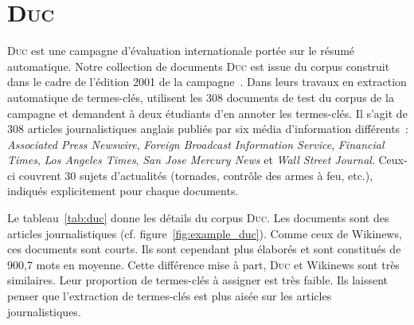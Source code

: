   \section[\textsc{Duc}]{\textsc{Duc}~\textnormal{\large\cite{wan2008expandrank}}}
  \label{sec:main-data_description-duc_data}
    \textsc{Duc} est une campagne d'évaluation internationale portée sur le
    résumé automatique. Notre collection de documents \textsc{Duc} est issue du
    corpus construit dans le cadre de l'édition 2001 de la
    campagne~\cite{over2001duc}. Dans leurs travaux en extraction automatique de
    termes-clés,  utilisent les 308 documents de test
    du corpus de la campagne et demandent à deux étudiants d'en annoter les
    termes-clés. Il s'agit de 308 articles journalistiques  anglais publiés par
    six média d'information différents~: \textit{Associated Press Newswire},
    \textit{Foreign Broadcast Information Service}, \textit{Financial Times},
    \textit{Los Angeles Times}, \textit{San Jose Mercury News} et \textit{Wall
    Street Journal}. Ceux-ci couvrent 30 sujets d'actualités (tornades, contrôle
    des armes à feu, etc.), indiqués explicitement pour chaque documents.
    
    Le tableau~\ref{tab:duc} donne les détails du corpus \textsc{Duc}. Les
    documents sont des articles journalistiques (cf.
    figure~\ref{fig:example_duc}). Comme ceux de Wikinews, ces documents sont
    courts. Ils sont cependant plus élaborés et sont constitués de 900,7 mots en
    moyenne. Cette différence mise à part, \textsc{Duc} et Wikinews sont très
    similaires. Leur proportion de termes-clés à assigner est très faible. Ils
    laissent penser que l'extraction de termes-clés est plus aisée sur les
    articles journalistiques.

    \begin{table}[!h]
      \centering

      \caption{Corpus \textsc{Duc}
               \label{tab:duc}}
    \end{table}

